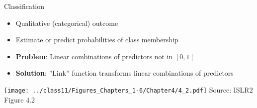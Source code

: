 \documentclass[ignorenonframetext,xcolor=x11names]{beamer}
\begin{document}

\begin{frame}{Classification}
  \begin{itemize}
     \item Qualitative (categorical) outcome
     \item Estimate or predict probabilities of class membership
     \item \textbf{Problem}: Linear combinations of predictors not in $[0, 1]$
     \item \textbf{Solution}: ''Link'' function transforms linear combinations of predictors
  \end{itemize}
\texttt{[image: ../class11/Figures\_Chapters\_1-6/Chapter4/4\_2.pdf]}
\scriptsize Source: ISLR2 Figure 4.2
\end{frame}
\end{document}
